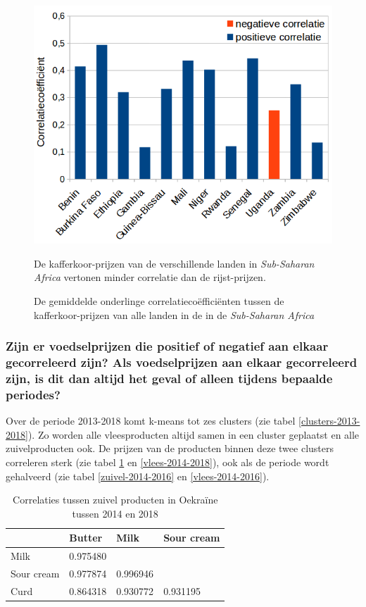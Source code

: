 \documentclass{article}
\begin{document}
 \begin{figure}[h!]
        \centering
        \includegraphics[scale=0.4]{sorghum_corr.png}
        \caption{De gemiddelde onderlinge correlatiecoëfficiënten tussen de kafferkoor-prijzen van alle landen in de in de \textit{Sub-Saharan Africa}}
        \label{sorghum-corr}
        \medskip
        \small
        De kafferkoor-prijzen van de verschillende landen in \textit{Sub-Saharan Africa} vertonen minder correlatie dan de rijst-prijzen.
        \end{figure}
\newpage

\subsubsection*{Zijn er voedselprijzen die positief of negatief aan elkaar gecorreleerd zijn? Als voedselprijzen aan elkaar gecorreleerd zijn, is dit dan altijd het geval of alleen tijdens bepaalde periodes?}
Over de periode 2013-2018 komt k-means tot zes clusters (zie tabel \ref{clusters-2013-2018}). Zo worden alle vleesproducten altijd samen in een cluster geplaatst en alle zuivelproducten ook. De prijzen van de producten binnen deze twee clusters correleren sterk (zie tabel \ref{zuivel-2014-2018} en \ref{vlees-2014-2018}), ook als de periode wordt gehalveerd (zie tabel \ref{zuivel-2014-2016} en \ref{vlees-2014-2016}).
 
 
 \begin{table}[ht!]
\centering
\caption{Correlaties tussen zuivel producten in Oekraïne tussen 2014 en 2018}
\label{zuivel-2014-2018}
\begin{tabular}{l|lll}
            & Butter   & Milk     & Sour cream \\ \hline
Milk        & 0.975480 &          &            \\
Sour cream  & 0.977874 & 0.996946 &            \\
Curd        & 0.864318 & 0.930772 & 0.931195  
\end{tabular}
\end{table}
\end{document}
